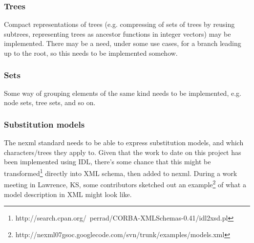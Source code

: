 \documentclass{article}
\begin{document}
\subsubsection{Trees}
Compact representations of trees (e.g. compressing of sets of trees by reusing subtrees, representing trees as ancestor functions in integer vectors) may be implemented. There may be a need, under some use cases, for a branch leading up to the root, so this needs to be implemented somehow.

\subsubsection{Sets}
Some way of grouping elements of the same kind needs to be implemented, e.g. node sets, tree sets, and so on.

\subsubsection{Substitution models}
The nexml standard needs to be able to express substitution models, and which characters/trees they apply to. Given that 
the work to date on this project has been implemented using IDL, there's some chance that 
this might be transformed\footnote{http://search.cpan.org/~perrad/CORBA-XMLSchemas-0.41/idl2xsd.pl} directly into XML schema, 
then added to nexml. During a work meeting in Lawrence, KS, some contributors sketched out an 
example\footnote{http://nexml07gsoc.googlecode.com/svn/trunk/examples/models.xml} of what a model description in XML might look like.
\end{document}
